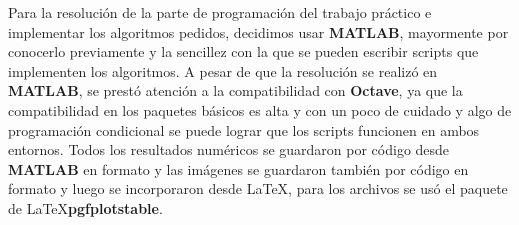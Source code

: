 Para la resolución de la parte de programación del trabajo práctico e implementar los algoritmos pedidos, decidimos usar \textbf{MATLAB}, mayormente por conocerlo previamente y la sencillez con la que se pueden escribir scripts que implementen los algoritmos. A pesar de que la resolución se realizó en \textbf{MATLAB}, se prestó atención a la compatibilidad con \textbf{Octave}, ya que la compatibilidad en los paquetes básicos es alta y con un poco de cuidado y algo de programación condicional se puede lograr que los scripts funcionen en ambos entornos.
Todos los resultados numéricos se guardaron por código desde \textbf{MATLAB} en formato \textbf{} y las imágenes se guardaron también por código en formato \textbf{} y luego se incorporaron desde \LaTeX, para los archivos \textbf{} se usó el paquete de \LaTeX \textbf{pgfplotstable}. 


